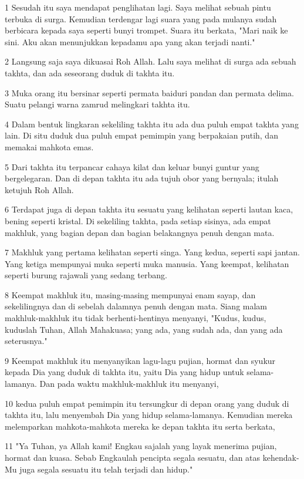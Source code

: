 \par 1 Sesudah itu saya mendapat penglihatan lagi. Saya melihat sebuah pintu terbuka di surga. Kemudian terdengar lagi suara yang pada mulanya sudah berbicara kepada saya seperti bunyi trompet. Suara itu berkata, "Mari naik ke sini. Aku akan menunjukkan kepadamu apa yang akan terjadi nanti."
\par 2 Langsung saja saya dikuasai Roh Allah. Lalu saya melihat di surga ada sebuah takhta, dan ada seseorang duduk di takhta itu.
\par 3 Muka orang itu bersinar seperti permata baiduri pandan dan permata delima. Suatu pelangi warna zamrud melingkari takhta itu.
\par 4 Dalam bentuk lingkaran sekeliling takhta itu ada dua puluh empat takhta yang lain. Di situ duduk dua puluh empat pemimpin yang berpakaian putih, dan memakai mahkota emas.
\par 5 Dari takhta itu terpancar cahaya kilat dan keluar bunyi guntur yang bergelegaran. Dan di depan takhta itu ada tujuh obor yang bernyala; itulah ketujuh Roh Allah.
\par 6 Terdapat juga di depan takhta itu sesuatu yang kelihatan seperti lautan kaca, bening seperti kristal. Di sekeliling takhta, pada setiap sisinya, ada empat makhluk, yang bagian depan dan bagian belakangnya penuh dengan mata.
\par 7 Makhluk yang pertama kelihatan seperti singa. Yang kedua, seperti sapi jantan. Yang ketiga mempunyai muka seperti muka manusia. Yang keempat, kelihatan seperti burung rajawali yang sedang terbang.
\par 8 Keempat makhluk itu, masing-masing mempunyai enam sayap, dan sekelilingnya dan di sebelah dalamnya penuh dengan mata. Siang malam makhluk-makhluk itu tidak berhenti-hentinya menyanyi, "Kudus, kudus, kuduslah Tuhan, Allah Mahakuasa; yang ada, yang sudah ada, dan yang ada seterusnya."
\par 9 Keempat makhluk itu menyanyikan lagu-lagu pujian, hormat dan syukur kepada Dia yang duduk di takhta itu, yaitu Dia yang hidup untuk selama-lamanya. Dan pada waktu makhluk-makhluk itu menyanyi,
\par 10 kedua puluh empat pemimpin itu tersungkur di depan orang yang duduk di takhta itu, lalu menyembah Dia yang hidup selama-lamanya. Kemudian mereka melemparkan mahkota-mahkota mereka ke depan takhta itu serta berkata,
\par 11 "Ya Tuhan, ya Allah kami! Engkau sajalah yang layak menerima pujian, hormat dan kuasa. Sebab Engkaulah pencipta segala sesuatu, dan atas kehendak-Mu juga segala sesuatu itu telah terjadi dan hidup."

